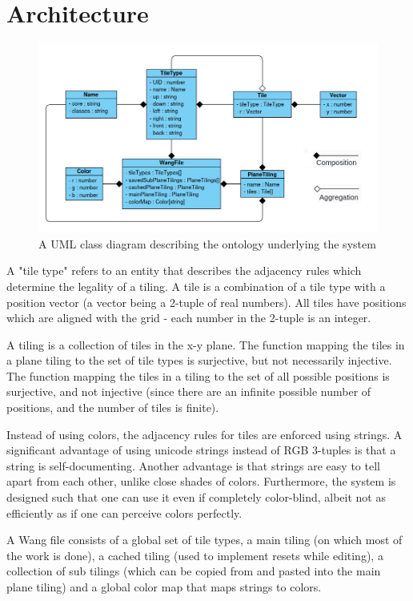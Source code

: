 \documentclass[letterpaper,11pt]{article}
\begin{document}
\section*{Architecture}

\begin{figure}[h!tbp]
	\centering
	\includegraphics[width=6.4in]{figures/class-diagram.png}
	\caption{A UML class diagram describing the ontology underlying the system}
	\label{fig:1}
\end{figure}

A "tile type" refers to an entity that describes the adjacency rules which determine the legality of a tiling. A tile is a combination of a tile type with a position vector (a vector being a 2-tuple of real numbers). All tiles have positions which are aligned with the grid - each number in the 2-tuple is an integer.

A tiling is a collection of tiles in the x-y plane. The function mapping the tiles in a plane tiling to the set of tile types is surjective, but not necessarily injective. The function mapping the tiles in a tiling to the set of all possible positions is surjective, and not injective (since there are an infinite possible number of positions, and the number of tiles is finite).


Instead of using colors, the adjacency rules for tiles are enforced using strings. A significant advantage of using unicode strings instead of RGB 3-tuples is that a string is self-documenting. Another advantage is that strings are easy to tell apart from each other, unlike close shades of colors. Furthermore, the system is designed such that one can use it even if completely color-blind, albeit not as efficiently as if one can perceive colors perfectly.

A Wang file consists of a global set of tile types, a main tiling (on which most of the work is done), a cached tiling (used to implement resets while editing), a collection of sub tilings (which can be copied from and pasted into the main plane tiling) and a global color map that maps strings to colors. 
\end{document}

